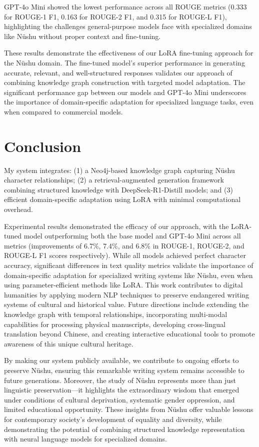 \documentclass{article}
\begin{document}
GPT-4o Mini showed the lowest performance across all ROUGE metrics (0.333 for ROUGE-1 F1, 0.163 for ROUGE-2 F1, and 0.315 for ROUGE-L F1), highlighting the challenges general-purpose models face with specialized domains like N\"{u}shu without proper context and fine-tuning.

These results demonstrate the effectiveness of our LoRA fine-tuning approach for the N\"{u}shu domain. The fine-tuned model's superior performance in generating accurate, relevant, and well-structured responses validates our approach of combining knowledge graph construction with targeted model adaptation. The significant performance gap between our models and GPT-4o Mini underscores the importance of domain-specific adaptation for specialized language tasks, even when compared to commercial models.


\section{Conclusion}
\label{sec:conc}
    My system integrates: (1) a Neo4j-based knowledge graph capturing N\"{u}shu character relationships; (2) a retrieval-augmented generation framework combining structured knowledge with DeepSeek-R1-Distill models; and (3) efficient domain-specific adaptation using LoRA with minimal computational overhead.

    Experimental results demonstrated the efficacy of our approach, with the LoRA-tuned model outperforming both the base model and GPT-4o Mini across all metrics (improvements of 6.7\%, 7.4\%, and 6.8\% in ROUGE-1, ROUGE-2, and ROUGE-L F1 scores respectively). While all models achieved perfect character accuracy, significant differences in text quality metrics validate the importance of domain-specific adaptation for specialized writing systems like N\"{u}shu, even when using parameter-efficient methods like LoRA.    This work contributes to digital humanities by applying modern NLP techniques to preserve endangered writing systems of cultural and historical value. Future directions include extending the knowledge graph with temporal relationships, incorporating multi-modal capabilities for processing physical manuscripts, developing cross-lingual translation beyond Chinese, and creating interactive educational tools to promote awareness of this unique cultural heritage.

    By making our system publicly available, we contribute to ongoing efforts to preserve N\"{u}shu, ensuring this remarkable writing system remains accessible to future generations. Moreover, the study of N\"{u}shu represents more than just linguistic preservation—it highlights the extraordinary wisdom that emerged under conditions of cultural deprivation, systematic gender oppression, and limited educational opportunity. 
    These insights from N\"{u}shu offer valuable lessons for contemporary society's development of equality and diversity, while demonstrating the potential of combining structured knowledge representation with neural language models for specialized domains.
\end{document}
